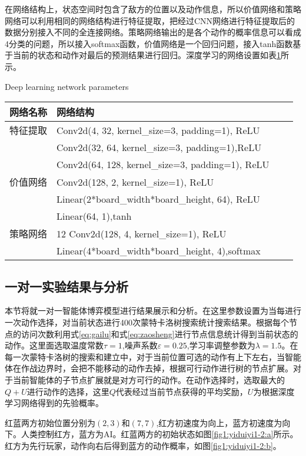 在网络结构上，状态空间时包含了敌方的位置以及动作信息，所以价值网络和策略网络可以利用相同的网络结构进行特征提取，把经过CNN网络进行特征提取后的数据分别接入不同的全连接网络。策略网络输出的是各个动作的概率信息可以看成4分类的问题，所以接入softmax函数，价值网络是一个回归问题，接入tanh函数基于当前的状态和动作对最后的预测结果进行回归。深度学习的网络设置如表\ref{tab4}所示。

\begin{table}[htbp]
	\centering
	{ Deep learning network parameters }
	\label{tab4}
	\begin{tabular}{llll} \toprule
		网络名称   & 网络结构  \\  \midrule
		特征提取 &	Conv2d(4, 32, kernel\_size=3, padding=1), ReLU\\
		&	Conv2d(32, 64, kernel\_size=3, padding=1),ReLU\\
		&	Conv2d(64, 128, kernel\_size=3, padding=1), ReLU\\
		价值网络&Conv2d(128, 2, kernel\_size=1), ReLU\\
		&Linear(2*board\_width*board\_height, 64), ReLU\\
		&Linear(64, 1),tanh\\
		策略网络&12 Conv2d(128, 4, kernel\_size=1), ReLU\\
		&Linear(4*board\_width*board\_height,
		4),softmax\\
		
		\bottomrule
	\end{tabular}
\end{table}


\subsection{一对一实验结果与分析}
本节将就一对一智能体博弈模型进行结果展示和分析。在这里参数设置为当每进行一次动作选择，对当前状态进行400次蒙特卡洛树搜索统计搜索结果。根据每个节点的访问次数利用式\ref{eq:gailu}和式\ref{eq:zaosheng}进行节点信息统计得到当前状态的动作。这里面选取温度常数$\tau=1$,噪声系数$\varepsilon=0.25$,学习率调整参数为$\lambda=1.5$。在每一次蒙特卡洛树的搜索和建立中，对于当前位置可选的动作有上下左右，当智能体在作战边界时，会把不能移动的动作去掉，根据可行动作进行树的节点扩展。对于当前智能体的子节点扩展就是对方可行的动作。在动作选择时，选取最大的$Q+U$进行动作的选择，这里$Q$代表经过当前节点获得的平均奖励，$U$为根据深度学习网络得到的先验概率。

红蓝两方初始位置分别为$(2,3)$和$(7,7)$,红方初速度为向上，蓝方初速度为向下。人类控制红方，蓝方为AI。红蓝两方的初始状态如图\ref{fig1:yiduiyi1-2:a}所示。红方为先行玩家，动作向右后得到蓝方的动作概率，如图\ref{fig1:yiduiyi1-2:b}。


